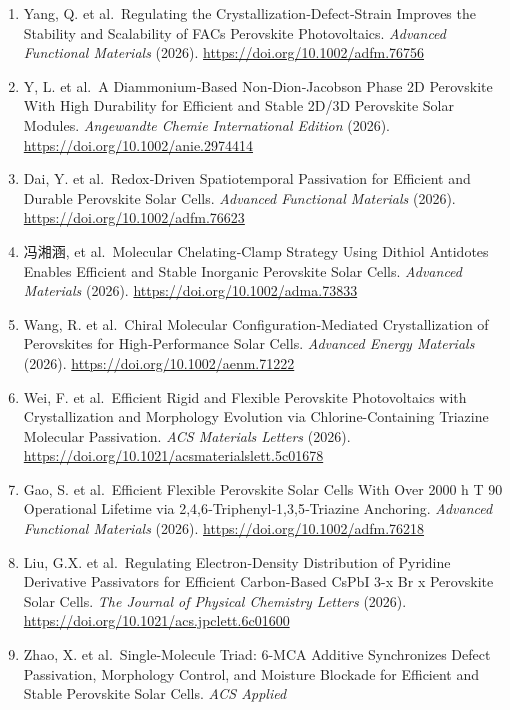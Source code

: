 \documentclass[
  11pt,
]{article}
\begin{document}
\begin{enumerate}
  perovskite solar cells. \emph{Nature Communications} (2026).
  \url{https://doi.org/10.1038/s41467-026-74288-2}
\item
  Yang, Q. et al.~Regulating the Crystallization‐Defect‐Strain Improves
  the Stability and Scalability of FACs Perovskite Photovoltaics.
  \emph{Advanced Functional Materials} (2026).
  \url{https://doi.org/10.1002/adfm.76756}
\item
  Y, L. et al.~A Diammonium‐Based Non‐Dion‐Jacobson Phase 2D Perovskite
  With High Durability for Efficient and Stable 2D/3D Perovskite Solar
  Modules. \emph{Angewandte Chemie International Edition} (2026).
  \url{https://doi.org/10.1002/anie.2974414}
\item
  Dai, Y. et al.~Redox‐Driven Spatiotemporal Passivation for Efficient
  and Durable Perovskite Solar Cells. \emph{Advanced Functional
  Materials} (2026). \url{https://doi.org/10.1002/adfm.76623}
\item
  冯湘涵, et al.~Molecular Chelating‐Clamp Strategy Using Dithiol
  Antidotes Enables Efficient and Stable Inorganic Perovskite Solar
  Cells. \emph{Advanced Materials} (2026).
  \url{https://doi.org/10.1002/adma.73833}
\item
  Wang, R. et al.~Chiral Molecular Configuration‐Mediated
  Crystallization of Perovskites for High‐Performance Solar Cells.
  \emph{Advanced Energy Materials} (2026).
  \url{https://doi.org/10.1002/aenm.71222}
\item
  Wei, F. et al.~Efficient Rigid and Flexible Perovskite Photovoltaics
  with Crystallization and Morphology Evolution via Chlorine-Containing
  Triazine Molecular Passivation. \emph{ACS Materials Letters} (2026).
  \url{https://doi.org/10.1021/acsmaterialslett.5c01678}
\item
  Gao, S. et al.~Efficient Flexible Perovskite Solar Cells With Over
  2000 h T 90 Operational Lifetime via 2,4,6‐Triphenyl‐1,3,5‐Triazine
  Anchoring. \emph{Advanced Functional Materials} (2026).
  \url{https://doi.org/10.1002/adfm.76218}
\item
  Liu, G.X. et al.~Regulating Electron-Density Distribution of Pyridine
  Derivative Passivators for Efficient Carbon-Based CsPbI 3-x Br x
  Perovskite Solar Cells. \emph{The Journal of Physical Chemistry
  Letters} (2026). \url{https://doi.org/10.1021/acs.jpclett.6c01600}
\item
  Zhao, X. et al.~Single-Molecule Triad: 6-MCA Additive Synchronizes
  Defect Passivation, Morphology Control, and Moisture Blockade for
  Efficient and Stable Perovskite Solar Cells. \emph{ACS Applied
}
\end{enumerate}
\end{document}
